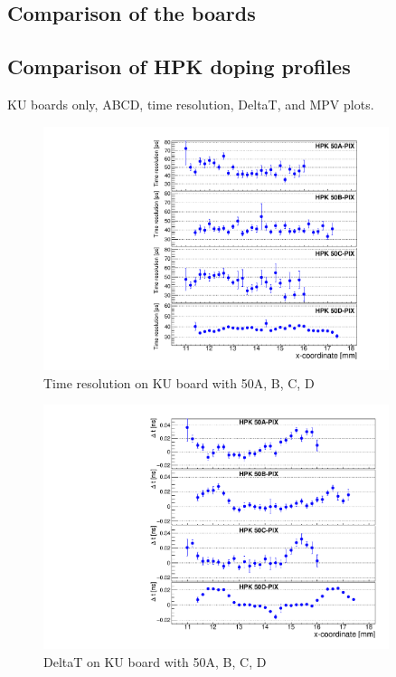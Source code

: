 \documentclass[preprint,1p]{elsarticle}
\begin{document}
\subsection{Comparison of the boards}


\subsection{Comparison of HPK doping profiles}

KU boards only, ABCD, time resolution, DeltaT, and MPV plots. 

\begin{figure}[htbp] 
\centering
\includegraphics[width=0.9\textwidth]{figs/KUBoard_HPK50ABCD/KUBoard_50ABCD_TimeResolution.pdf} 
\caption{Time resolution on KU board with 50A, B, C, D } 
\label{fig:Sensors} 
\end{figure} 

\begin{figure}[htbp] 
\centering
\includegraphics[width=0.9\textwidth]{figs/KUBoard_HPK50ABCD/KUBoard_50ABCD_MeanTime.pdf} 
\caption{DeltaT on KU board with 50A, B, C, D } 
\label{fig:Sensors} 
\end{figure} 
\end{document}
